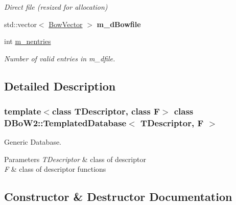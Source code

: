 \begin{DoxyCompactItemize}
\begin{DoxyCompactList}\small\item\em Direct file (resized for allocation) \end{DoxyCompactList}\item 
\mbox{\label{classDBoW2_1_1TemplatedDatabase_aa4437e8fddbd4f7024086a3851580952}} 
std\+::vector$<$ \hyperlink{classDBoW2_1_1BowVector}{Bow\+Vector} $>$ {\bfseries m\+\_\+d\+Bowfile}
\item 
\mbox{\label{classDBoW2_1_1TemplatedDatabase_a42e3e42a79ffeb46b5020c477567324d}} 
int \hyperlink{classDBoW2_1_1TemplatedDatabase_a42e3e42a79ffeb46b5020c477567324d}{m\+\_\+nentries}
\begin{DoxyCompactList}\small\item\em Number of valid entries in m\+\_\+dfile. \end{DoxyCompactList}\end{DoxyCompactItemize}


\subsection{Detailed Description}
\subsubsection*{template$<$class T\+Descriptor, class F$>$\newline
class D\+Bo\+W2\+::\+Templated\+Database$<$ T\+Descriptor, F $>$}

Generic Database. 


\begin{DoxyParams}{Parameters}
{\em T\+Descriptor} & class of descriptor \\
\hline
{\em F} & class of descriptor functions \\
\hline
\end{DoxyParams}


\subsection{Constructor \& Destructor Documentation}
\mbox{\label{classDBoW2_1_1TemplatedDatabase_a1353c2b87638fc27696fcc87b09d65cb}} 
